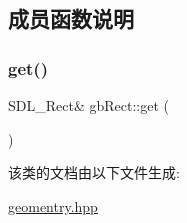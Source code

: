 \subsection{成员函数说明}
\mbox{\label{classgb_rect_acffe4a05edb23c1e9169db77599de202}} 
\subsubsection{\texorpdfstring{get()}{get()}}
{\footnotesize\ttfamily S\+D\+L\+\_\+\+Rect\& gb\+Rect\+::get (\begin{DoxyParamCaption}{ }\end{DoxyParamCaption})}



该类的文档由以下文件生成\+:\begin{DoxyCompactItemize}
\item 
\mbox{\hyperlink{geomentry_8hpp}{geomentry.\+hpp}}\end{DoxyCompactItemize}
